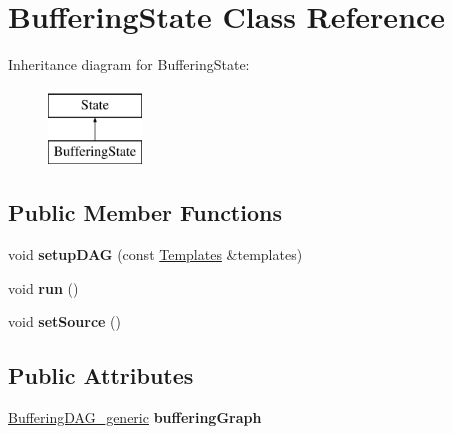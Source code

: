 \hypertarget{classBufferingState}{\section{Buffering\-State Class Reference}
\label{classBufferingState}
}
Inheritance diagram for Buffering\-State\-:\begin{figure}[H]
\begin{center}
\leavevmode
\includegraphics[height=2.000000cm]{classBufferingState}
\end{center}
\end{figure}
\subsection*{Public Member Functions}
\begin{DoxyCompactItemize}
\item 
\hypertarget{classBufferingState_ac17a03512a9faf5f72c85d3a62c18b48}{void {\bfseries setup\-D\-A\-G} (const \hyperlink{structTemplates}{Templates} \&templates)}\label{classBufferingState_ac17a03512a9faf5f72c85d3a62c18b48}

\item 
\hypertarget{classBufferingState_aebc85270708bf8801e76be66c92ea797}{void {\bfseries run} ()}\label{classBufferingState_aebc85270708bf8801e76be66c92ea797}

\item 
\hypertarget{classBufferingState_a03e1dafbc5324854cc8213214ffe6230}{void {\bfseries set\-Source} ()}\label{classBufferingState_a03e1dafbc5324854cc8213214ffe6230}

\end{DoxyCompactItemize}
\subsection*{Public Attributes}
\begin{DoxyCompactItemize}
\item 
\hypertarget{classBufferingState_a82786bc89a2076e2d451c0a94aacb2fb}{\hyperlink{classBufferingDAG__generic}{Buffering\-D\-A\-G\-\_\-generic} {\bfseries buffering\-Graph}}\label{classBufferingState_a82786bc89a2076e2d451c0a94aacb2fb}

\end{DoxyCompactItemize}

